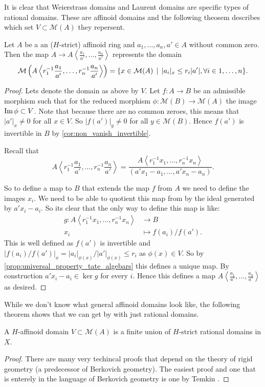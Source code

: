 It is clear that Weierstrass domains and Laurent domains are specific types of rational domains. 
These are affinoid domains and the following theosem describes which set $V \subset \mathcal{M} (A)$ they repersent. 
\begin{proposition}
	Let $A$ be a an ($H$-strict) affinoid ring and $a_1, \ldots, a_n, a' \in A$ without common zero.
	Then the map $A \to A\left<\frac{a_1}{a'}, \ldots, \frac{a_n}{a'} \right>$ represents the domain \[
		\mathcal{M} \left(A \left<r^{-1}_1\frac{a_1}{a'}, \ldots, r^{-1}_n\frac{a_n}{a'}\right> \right) = \{x \in \mathcal{M} (A) \st |a_i|_x \le r_i|a'|, \forall i \in 1, \ldots, n\} 
	.\] 
\end{proposition}
\begin{proof}
	Lets denote the domain as above by $V$. 
	Let $f:A \to B$ be an admissible morphism such that for the reduced morphism $\phi: \mathcal{M} (B) \to \mathcal{M} (A)$ the image $\operatorname{Im} \phi \subset  V$.
	Note that because there are no common zeroes, this means that $|a'|_x \ne 0$ for all $x \in V$. 
	So $|f(a')|_{y} \ne 0$ for all $y \in \mathcal{M} (B)$. 
	Hence $f(a')$ is invertible in $B$ by \cref{cor:non_vanish_invertible}. 

	Recall that \[
	A\left<r^{-1}_1\frac{a_1}{a'}, \ldots, r_n^{-1}\frac{a_n}{a'} \right> = \frac{A\left<r_1^{-1}x_1, \ldots, r_n^{-1}x_n \right>}{(a' x_1 - a_1, \ldots, a' x_n - a_n)}
	.\] 

	So to define a map to $B$ that extends the map $f$ from $A$ we need to define the images $x_i$. 
	We need to be able to quotient this map from by the ideal generated by $a'x_i - a_i$. 
	So its clear that the only way to define this map is like:
	\begin{align*}
		g: A\left<r_1^{-1}x_1, \ldots, r_n^{-1}x_n \right> &\longrightarrow B \\
		x_i &\longmapsto f(a_i) / f(a')
	.\end{align*}
	This is well defined as $f(a')$ is invertible and $|f(a_i) / f(a')|_x = |a_i|_{\phi(x)} / |a'|_{\phi(x)} \le r_i$ as $\phi(x) \in V$. 
	So by \cref{prop:universal_property_tate_algebars} this defines a unique map. 
	By construction $a'x_i - a_i \in \ker g$ for every $i$. Hence this defines a map $A \left<\frac{a_1}{a'}, \ldots, \frac{a_n}{a'} \right>$ as desired. 
\end{proof}

While we don't know what general affinoid domains look like, the following theorem shows that we can get by with just rational domains. 
\begin{proposition}
	A $H$-affinoid domain $V \subset  \mathcal{M} (A)$ is a finite union of $H$-strict rational domains in $X$.
\end{proposition}
\begin{proof}
	There are many very techincal proofs that depend on the theory of rigid geometry (a predecessor of Berkovich geometry).
	The easiest proof and one that is enterely in the language of Berkovich geometry is one by Temkin \cite{temkinNewProofGerritzenGrauert2005}.
\end{proof}




